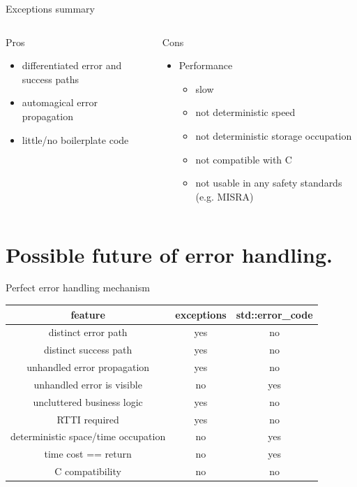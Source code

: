 \documentclass[10pt]{beamer}
\begin{document}
\begin{frame}{Exceptions summary}
	\begin{columns}[T]
		\begin{column}{0.48\linewidth}
			Pros
			\begin{itemize}[<+- | alert@+>]
				\item differentiated error and success paths
				\item automagical error propagation
				\item little/no boilerplate code
			\end{itemize} \pause
		\end{column}
	\begin{column}{0.48\linewidth}
			Cons
			\begin{itemize}
				\item Performance
				\begin{itemize}[<+- | alert@+>]
					\item slow
					\item not deterministic speed
					\item not deterministic storage occupation
					\item not compatible with C
					\item not usable in any safety standards (e.g. MISRA)
				\end{itemize}
			\end{itemize}
	\end{column}
	\end{columns}
\end{frame}

\section{Possible future of error handling.}

\begin{frame}{Perfect error handling mechanism}
	\centering
	\begin{tabular}{|c|c|c|}
		\hline
		feature & exceptions & std::error\_code \\ \hline \hline
		distinct error path & yes & no \\ \hline
		distinct success path & yes & no \\ \hline \hline
		unhandled error propagation & yes & no \\ \hline
		unhandled error is visible & no & yes \\ \hline
		uncluttered business logic & yes & no \\ \hline \hline
		RTTI required & yes & no \\ \hline
		deterministic space/time occupation & no & yes \\ \hline
		time cost == return & no & yes \\ \hline \hline
		C compatibility & no & no \\ \hline
	\end{tabular}
\end{frame}
\end{document}
